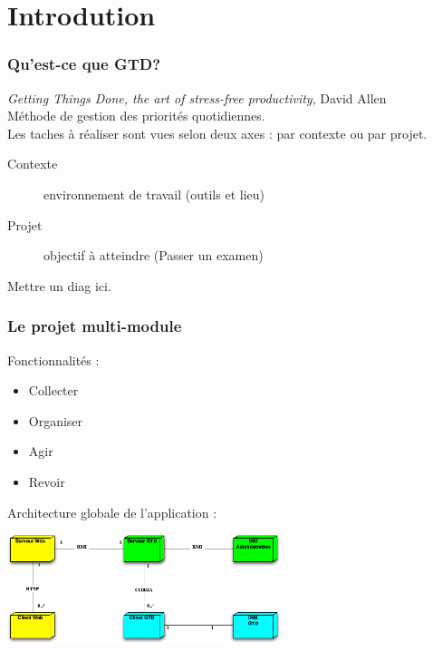 \section*{Introdution}

\begin{frame}
\frametitle{Qu'est-ce que GTD?}
\emph{Getting Things Done, the art of stress-free productivity}, David Allen\\
M\'ethode de gestion des priorit\'es quotidiennes.\\
Les taches \`a  r\'ealiser sont vues selon deux axes : par contexte ou par projet.\\
\begin{description}
\item[Contexte]environnement de travail (outils et lieu)
\item[Projet]objectif \`a atteindre (Passer un examen)
\end{description}
Mettre un diag ici.
\end{frame}

\begin{frame}
\frametitle{Le projet multi-module}
Fonctionnalit\'es :
\begin{itemize}
\item Collecter
\item Organiser
\item Agir
\item Revoir
\end{itemize}
\pause
Architecture globale de l'application : \\
\begin{center}
\includegraphics[width=8cm]{images/archi_gen}
\end{center}
\end{frame}